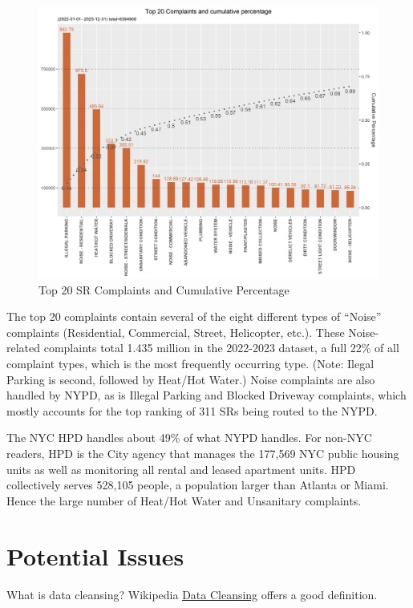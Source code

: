 \documentclass[12pt, titlepage]{article}
\begin{document}
\begin{figure}[htbp]
  \centering
	  \includegraphics[scale=0.65]{SRs_by_Complaint_Type.png}
	  \caption{Top 20 SR Complaints and Cumulative Percentage}
	  \label{fig:SR_complaints}
\end{figure}

The top 20 complaints contain several of the eight different types of ``Noise'' complaints (Residential, Commercial, Street, Helicopter, etc.). These Noise-related
complaints total 1.435 million in the 2022-2023 dataset, a full 22\% of all complaint types, which is the most frequently occurring type. (Note: Ilegal Parking is 
second, followed by Heat/Hot Water.) Noise complaints are also handled by NYPD, as is Illegal Parking and Blocked Driveway complaints, which mostly
accounts for the top ranking of 311 SRs being routed to the NYPD.

The NYC HPD handles about 49\% of what NYPD handles. For  non-NYC readers, 
HPD is the City agency that manages the  177,569 NYC public housing units as well as monitoring all rental and leased apartment units. HPD collectively
serves 528,105 people, a population larger than Atlanta or Miami. Hence the large number of Heat/Hot Water and Unsanitary complaints. 

\section{Potential Issues} \label{sec:issues}

What is data cleansing?  Wikipedia \href{https://en.wikipedia.org/wiki/Data_cleansing}{Data Cleansing} offers a good definition. 
\end{document}
